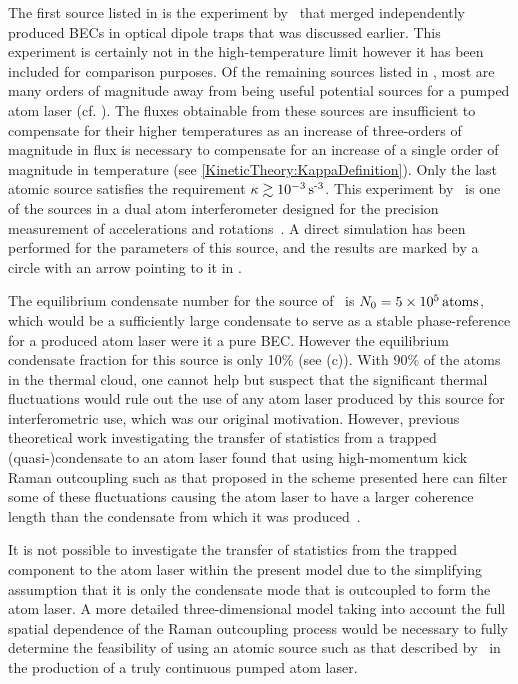 The first source listed in  is the experiment by~\citet{Chikkatur:2002qa} that merged independently produced BECs in optical dipole traps that was discussed earlier.  This experiment is certainly not in the high-temperature limit however it has been included for comparison purposes.  Of the remaining sources listed in , most are many orders of magnitude away from being useful potential sources for a pumped atom laser (cf. ).  The fluxes obtainable from these sources are insufficient to compensate for their higher temperatures as an increase of three-orders of magnitude in flux is necessary to compensate for an increase of a single order of magnitude in temperature (see \eqref{KineticTheory:KappaDefinition}).  Only the last atomic source satisfies the requirement $\kappa \gtrsim \unit[10^{-3}]{s\textsuperscript{-3}}$.  This experiment by~\citet{Muller:2007} is one of the sources in a dual atom interferometer designed for the precision measurement of accelerations and rotations~\citep{Muller:2009}.  A direct simulation has been performed for the parameters of this source, and the results are marked by a circle with an arrow pointing to it in .  

The equilibrium condensate number for the source of~\citet{Muller:2007} is $N_0 = \unit[5 \times 10^5]{atoms}$, which would be a sufficiently large condensate to serve as a stable phase-reference for a produced atom laser were it a pure BEC.  However the equilibrium condensate fraction for this source is only 10\% (see (c)).  With 90\% of the atoms in the thermal cloud, one cannot help but suspect that the significant thermal fluctuations would rule out the use of any atom laser produced by this source for interferometric use, which was our original motivation.  However, previous theoretical work investigating the transfer of statistics from a trapped (quasi-)condensate to an atom laser found that using high-momentum kick Raman outcoupling such as that proposed in the scheme presented here can filter some of these fluctuations causing the atom laser to have a larger coherence length than the condensate from which it was produced~\citep{Proukakis:2003}.  

It is not possible to investigate the transfer of statistics from the trapped component to the atom laser within the present model due to the simplifying assumption that it is only the condensate mode that is outcoupled to form the atom laser.  A more detailed three-dimensional model taking into account the full spatial dependence of the Raman outcoupling process would be necessary to fully determine the feasibility of using an atomic source such as that described by~\citet{Muller:2007} in the production of a truly continuous pumped atom laser.

